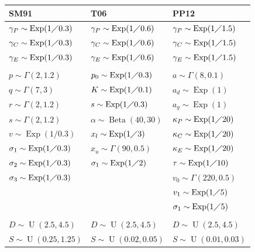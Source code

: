 \documentclass[a4paper,12pt]{article}
\begin{document}
\clearpage
\begin{table}
\begin{center}
\begin{tabular}{lll}
\toprule
SM91 & T06 &PP12 \\
\midrule
$\gamma_P \sim \operatorname{Exp}(1 \diagup 0.3)$ & $\gamma_P\sim \operatorname{Exp}(1 \diagup 0.6)$ & $\gamma_P\sim \operatorname{Exp}(1 \diagup 1.5)$ \\
$\gamma_C\sim \operatorname{Exp}(1 \diagup 0.3)$ & $\gamma_C\sim \operatorname{Exp}(1 \diagup 0.6)$ & $\gamma_C\sim \operatorname{Exp}(1 \diagup 1.5)$ \\
$\gamma_E\sim \operatorname{Exp}(1 \diagup 0.3)$ & $\gamma_E\sim \operatorname{Exp}(1 \diagup 0.6)$ & $\gamma_E\sim \operatorname{Exp}(1 \diagup 1.5)$ \\
&  & \\
$p\sim \Gamma(2,1.2)$ & $p_0\sim \operatorname{Exp}(1 \diagup 0.3)$ & $a\sim \Gamma(8,0.1)$\\
$q\sim \Gamma(7,3)$ & $K\sim \operatorname{Exp}(1 \diagup 0.1)$ & $a_d\sim \operatorname{Exp}(1)$\\
$r\sim \Gamma(2,1.2)$ & $s\sim \operatorname{Exp}(1 \diagup 0.3)$ & $a_g\sim \operatorname{Exp}(1)$\\
$s\sim \Gamma(2,1.2)$ & $\alpha\sim \operatorname{Beta}(40,30)$ & $\kappa_P\sim \operatorname{Exp}(1 \diagup 20)$ \\ 
$v\sim \operatorname{Exp}(1/0.3)$ & $x_l\sim \operatorname{Exp}(1 \diagup 3)$ & $\kappa_C\sim \operatorname{Exp}(1 \diagup 20)$ \\
$\sigma_1\sim \operatorname{Exp}(1 \diagup 0.3)$ & $x_u\sim \Gamma(90,0.5)$ & $\kappa_E\sim \operatorname{Exp}(1 \diagup 20)$ \\
$\sigma_2\sim \operatorname{Exp}(1 \diagup 0.3)$ & $\sigma_1\sim \operatorname{Exp}(1 \diagup 2)$ & $\tau\sim \operatorname{Exp}(1 \diagup 10)$ \\
$\sigma_3\sim \operatorname{Exp}(1 \diagup 0.3)$ & & $v_0 \sim \Gamma(220,0.5)$ \\
& &  $v_1\sim \operatorname{Exp}(1 \diagup 5)$\\
& &  $\sigma_1\sim \operatorname{Exp}(1 \diagup 5)$ \\
&   & \\
$D\sim \operatorname{U}(2.5,4.5)$ & $D\sim \operatorname{U}(2.5,4.5)$ & $D\sim \operatorname{U}(2.5,4.5)$ \\
$S\sim \operatorname{U}(0.25,1.25)$ & $S\sim \operatorname{U}(0.02,0.05)$ & $S\sim \operatorname{U}(0.01,0.03)$ \\

\end{tabular}
\end{center}
\end{table}
\end{document}
